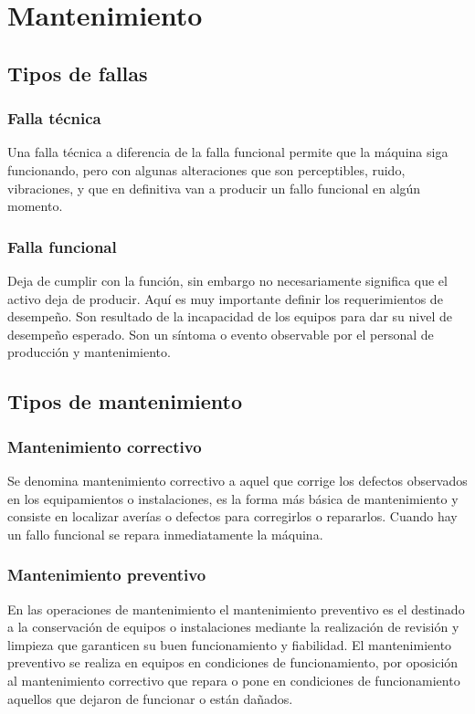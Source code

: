 \documentclass[../main]{subfiles}
\begin{document}
\chapter{Mantenimiento}
\section{Tipos de fallas}
\subsection{Falla técnica}
Una falla técnica a diferencia de la falla funcional permite que la
máquina siga funcionando, pero con algunas alteraciones que son
perceptibles, ruido, vibraciones, y que en definitiva van a producir
un fallo funcional en algún momento.
\subsection{Falla funcional}
Deja de cumplir con la función, sin embargo no necesariamente
significa que el activo deja de producir. Aquí es muy importante
definir los requerimientos de desempeño. Son resultado de la
incapacidad de los equipos para dar su nivel de desempeño esperado.
Son un síntoma o evento observable por el personal de producción y
mantenimiento.
\section{Tipos de mantenimiento}
\subsection{Mantenimiento correctivo}
Se denomina mantenimiento correctivo a aquel que corrige los defectos
observados en los equipamientos o instalaciones, es la forma más
básica de mantenimiento y consiste en localizar averías o defectos
para corregirlos o repararlos. Cuando hay un fallo funcional se
repara inmediatamente la máquina.
\subsection{Mantenimiento preventivo}
En las operaciones de mantenimiento el mantenimiento preventivo es el
destinado a la conservación de equipos o instalaciones mediante la
realización de revisión y limpieza que garanticen su buen
funcionamiento y fiabilidad. El mantenimiento preventivo se realiza
en equipos en condiciones de funcionamiento, por oposición al
mantenimiento correctivo que repara o pone en condiciones de
funcionamiento aquellos que dejaron de funcionar o están dañados.
\end{document}
